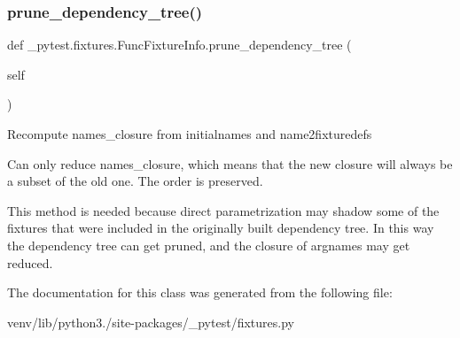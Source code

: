 \subsubsection{\texorpdfstring{prune\+\_\+dependency\+\_\+tree()}{prune\_dependency\_tree()}}
{\footnotesize\ttfamily def \+\_\+pytest.\+fixtures.\+Func\+Fixture\+Info.\+prune\+\_\+dependency\+\_\+tree (\begin{DoxyParamCaption}\item[{}]{self }\end{DoxyParamCaption})}

\begin{DoxyVerb}Recompute names_closure from initialnames and name2fixturedefs

Can only reduce names_closure, which means that the new closure will
always be a subset of the old one. The order is preserved.

This method is needed because direct parametrization may shadow some
of the fixtures that were included in the originally built dependency
tree. In this way the dependency tree can get pruned, and the closure
of argnames may get reduced.
\end{DoxyVerb}
 

The documentation for this class was generated from the following file\+:\begin{DoxyCompactItemize}
\item 
venv/lib/python3./site-\/packages/\+\_\+pytest/fixtures.\+py\end{DoxyCompactItemize}

